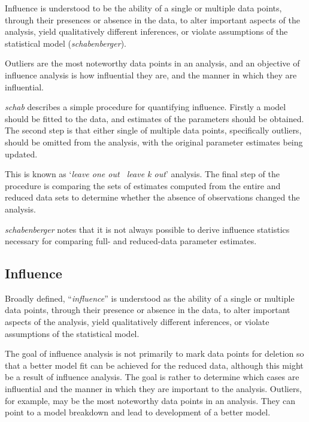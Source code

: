 \documentclass[00-MASTER.tex]{subfiles}
\begin{document}
	Influence is understood to be the ability of a single or multiple
	data points, through their presences or absence in the data, to
	alter important aspects of the analysis, yield qualitatively
	different inferences, or violate assumptions of the statistical
	model (\textit{schabenberger}).
	
	Outliers are the most noteworthy data points in an analysis, and
	an objective of influence analysis is how influential they are,
	and the manner in which they are influential.
	
	\emph{schab} describes a simple procedure for quantifying
	influence. Firstly a model should be fitted to the data, and
	estimates of the parameters should be obtained. The second step is
	that either single of multiple data points, specifically outliers,
	should be omitted from the analysis, with the original parameter
	estimates being updated. 
	
	This is known as `\textit{leave one out \ leave k
		out}' analysis. The final step of the procedure is comparing the
	sets of estimates computed from the entire and reduced data sets
	to determine whether the absence of observations changed the
	analysis.
	
	\textit{schabenberger} notes that it is not always possible to
	derive influence statistics necessary for comparing full- and
	reduced-data parameter estimates. 
	
	
	\subsection{Influence}
	Broadly
	defined, ``\textit{influence}” is understood as the ability of a single or multiple data points, through their presence
	or absence in the data, to alter important aspects of the analysis, yield qualitatively different inferences, or
	violate assumptions of the statistical model. 
	
	
	The goal of influence analysis is not primarily to mark data
	points for deletion so that a better model fit can be achieved for the reduced data, although this might be a
	result of influence analysis. The goal is rather to determine which cases are influential and the manner in
	which they are important to the analysis. Outliers, for example, may be the most noteworthy data points in
	an analysis. They can point to a model breakdown and lead to development of a better model.
	
\end{document}
